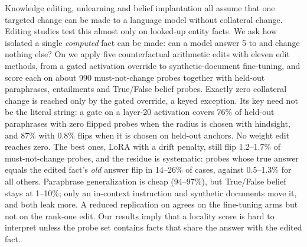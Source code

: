 Knowledge editing, unlearning and belief implantation all assume that one targeted change can be made to a language model without collateral change.
Editing studies test this almost only on looked-up entity facts.
We ask how isolated a single \emph{computed} fact can be made: can a model answer 5 to  and change nothing else?
On \llama we apply five counterfactual arithmetic edits with eleven edit methods, from a gated activation override to synthetic-document fine-tuning, and score each on about 990 must-not-change probes together with held-out paraphrases, entailments and True/False belief probes.
Exactly zero collateral change is reached only by the gated override, a keyed exception.
Its key need not be the literal string: a gate on a layer-20 activation covers 76\% of held-out paraphrases with zero flipped probes when the radius is chosen with hindsight, and 87\% with 0.8\% flips when it is chosen on held-out anchors.
No weight edit reaches zero.
The best ones, LoRA with a drift penalty, still flip 1.2--1.7\% of must-not-change probes, and the residue is systematic: probes whose true answer equals the edited fact's \emph{old} answer flip in 14--26\% of cases, against 0.5--1.3\% for all others.
Paraphrase generalization is cheap (94--97\%), but True/False belief stays at 1--10\%; only an in-context instruction and synthetic documents move it, and both leak more.
A reduced replication on \qwen agrees on the fine-tuning arms but not on the rank-one edit.
Our results imply that a locality score is hard to interpret unless the probe set contains facts that share the answer with the edited fact.
